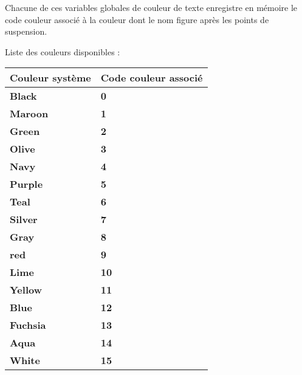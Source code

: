 \documentclass[a4paper,10pt]{article}
\begin{document}
\begin{justify}
    Chacune de ces variables globales de couleur de texte enregistre en mémoire le code couleur associé à la couleur dont le nom figure après les points de suspension.
\end{justify}

\begin{justify}
    Liste des couleurs disponibles :

    \begin{tabular}{|l|l|}
        \hline
        \textbf{Couleur système} & \textbf{Code couleur associé}\\
        \hline
        \textbf{\color{text}Black} & \textbf{\color{text}0}\\
        \hline
        \textbf{\color{Maroon}Maroon} & \textbf{\color{Maroon}1}\\
        \hline
        \textbf{\color{Green}Green} & \textbf{\color{Green}2}\\
        \hline
        \textbf{\color{Olive}Olive} & \textbf{\color{Olive}3}\\
        \hline
        \textbf{\color{Navy}Navy} & \textbf{\color{Navy}4}\\
        \hline
        \textbf{\color{Purple}Purple} & \textbf{\color{Purple}5}\\
        \hline
        \textbf{\color{Teal}Teal} & \textbf{\color{Teal}6}\\
        \hline
        \textbf{\color{Silver}Silver} & \textbf{\color{Silver}7}\\
        \hline
        \textbf{\color{Gray}Gray} & \textbf{\color{Gray}8}\\
        \hline
        \textbf{\color{Red}red} & \textbf{\color{Red}9}\\
        \hline
        \textbf{\color{Lime}Lime} & \textbf{\color{Lime}10}\\
        \hline
        \textbf{\color{Yellow}Yellow} & \textbf{\color{Yellow}11}\\
        \hline
        \textbf{\color{Blue}Blue} & \textbf{\color{Blue}12}\\
        \hline
        \textbf{\color{Fuchsia}Fuchsia} & \textbf{\color{Fuchsia}13}\\
        \hline
        \textbf{\color{Aqua}Aqua} & \textbf{\color{Aqua}14}\\
        \hline
        \textbf{\color{White}White} & \textbf{\color{White}15}\\
        \hline
    \end{tabular}


\end{justify}
\end{document}
